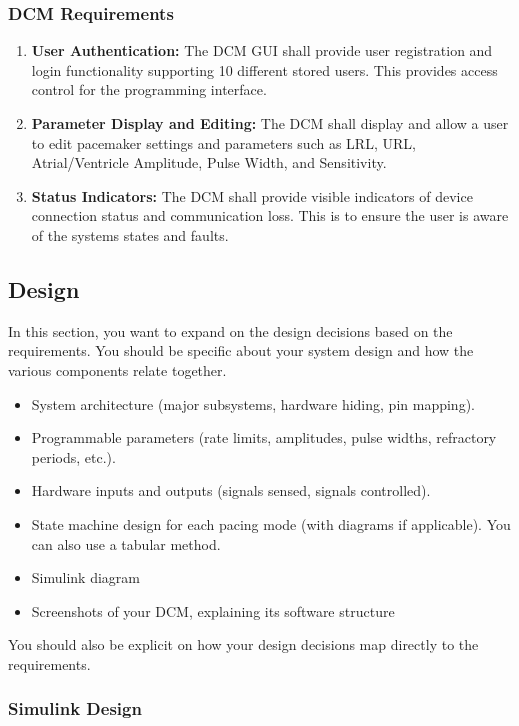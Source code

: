 \documentclass{article}
\begin{document}
\subsubsection{DCM Requirements}
\begin{enumerate}[label=]
    \item \textbf{User Authentication:} The DCM GUI shall provide user registration and login functionality supporting
    10 different stored users. This provides access control for the programming interface.
    \item \textbf{Parameter Display and Editing:} The DCM shall display and allow a user to edit pacemaker settings 
    and parameters such as LRL, URL, Atrial/Ventricle Amplitude, Pulse Width, and Sensitivity.
    \item \textbf{Status Indicators:} The DCM shall provide visible indicators of device connection status and communication loss. 
    This is to ensure the user is aware of the systems states and faults. 
\end{enumerate}

\newpage
\subsection{Design}
\label{dessec}
In this section, you want to expand on the design decisions based on the requirements. You should be specific about your system design and how the various components relate together.

\begin{itemize}
    \item System architecture (major subsystems, hardware hiding, pin mapping).
    \item Programmable parameters (rate limits, amplitudes, pulse widths, refractory periods, etc.).
    \item Hardware inputs and outputs (signals sensed, signals controlled).
    \item State machine design for each pacing mode (with diagrams if applicable). You can also use a tabular method.
    \item Simulink diagram
    \item Screenshots of your DCM, explaining its software structure
\end{itemize}

You should also be explicit on how your design decisions map directly to the requirements.

\newpage
\subsubsection{Simulink Design}
\end{document}

